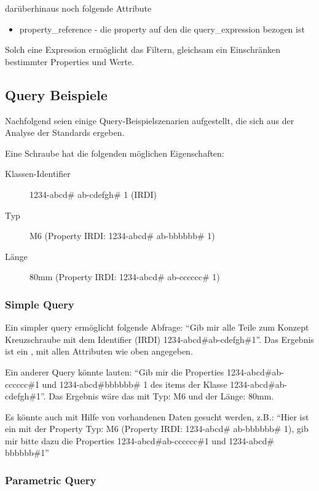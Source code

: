 darüberhinaus noch folgende Attribute

\begin{itemize}
\item property\_reference - die property auf den die query\_expression bezogen ist
\end{itemize}
Solch eine Expression ermöglicht das Filtern, gleichsam ein Einschränken bestimmter Properties und Werte. 

\subsection{Query Beispiele}\label{kap:query_beispiele}

Nachfolgend seien einige Query-Beispielszenarien aufgestellt, die sich aus der Analyse der Standards ergeben.

Eine Schraube hat die folgenden möglichen Eigenschaften: 

\begin{description}
\item[Klassen-Identifier] 1234-abcd\# ab-cdefgh\# 1 (IRDI)
\item[Typ] M6 (Property IRDI: 1234-abcd\# ab-bbbbbb\# 1)
\item[Länge] 80mm (Property IRDI: 1234-abcd\# ab-cccccc\# 1)
\end{description}

\subsubsection{Simple Query}

Ein simpler query ermöglicht folgende Abfrage: \enquote{Gib mir alle Teile zum Konzept Kreuzschraube mit dem Identifier (IRDI) 1234-abcd\#ab-cdefgh\#1}. Das Ergebnis ist ein , mit allen Attributen wie oben angegeben. 

Ein anderer Query könnte lauten: \enquote{Gib mir die Properties 1234-abcd\#ab-cccccc\#1 und 1234-abcd\#bbbbbb\# 1 des \glspl{item} der Klasse 1234-abcd\#ab-cdefgh\#1}. Das Ergebnis wäre das  mit Typ: M6 und der Länge: 80mm.

Es könnte auch mit Hilfe von vorhandenen Daten gesucht werden, z.B.:  \enquote{Hier ist ein  mit der Property Typ: M6 (Property IRDI: 1234-abcd\# ab-bbbbbb\# 1), gib mir bitte dazu die Properties 1234-abcd\#ab-cccccc\#1 und 1234-abcd\# bbbbbb\#1} 

\subsubsection{Parametric Query}

